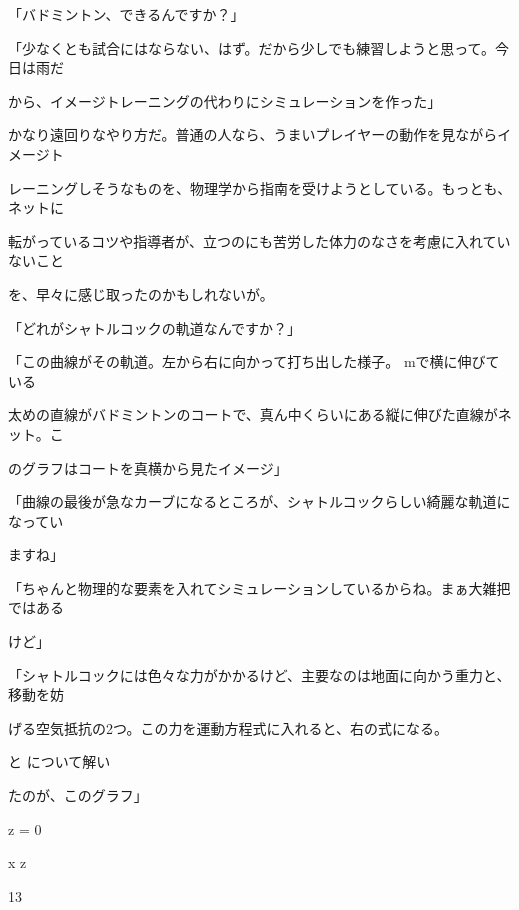 「バドミントン、できるんですか？」\par
「少なくとも試合にはならない、はず。だから少しでも練習しようと思って。今⽇は⾬だ\par
から、イメージトレーニングの代わりにシミュレーションを作った」\par
かなり遠回りなやり⽅だ。普通の⼈なら、うまいプレイヤーの動作を⾒ながらイメージト\par
レーニングしそうなものを、物理学から指南を受けようとしている。もっとも、ネットに\par
転がっているコツや指導者が、⽴つのにも苦労した体⼒のなさを考慮に⼊れていないこと\par
を、早々に感じ取ったのかもしれないが。\par
「どれがシャトルコックの軌道なんですか？」\par
「この曲線がその軌道。左から右に向かって打ち出した様⼦。  mで横に伸びている\par
太めの直線がバドミントンのコートで、真ん中くらいにある縦に伸びた直線がネット。こ\par
のグラフはコートを真横から⾒たイメージ」\par
「曲線の最後が急なカーブになるところが、シャトルコックらしい綺麗な軌道になってい\par
ますね」\par
「ちゃんと物理的な要素を⼊れてシミュレーションしているからね。まぁ⼤雑把ではある\par
けど」\par
「シャトルコックには⾊々な⼒がかかるけど、主要なのは地⾯に向かう重⼒と、移動を妨\par
げる空気抵抗の2つ。この⼒を運動⽅程式に⼊れると、右の式になる。\par
と について解い\par
たのが、このグラフ」\par
z = 0\par
x z\par
13\par

